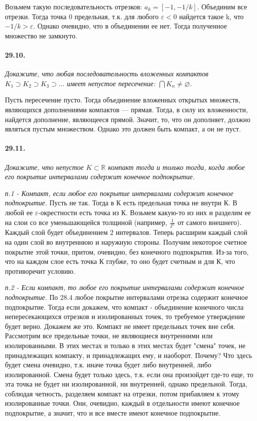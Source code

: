 \documentclass{book}
\begin{document}
Возьмем такую последовательность отрезков: $a_k = [-1, -1/k]$. Объединим все отрезки. Тогда точка 0 предельная, т.к. для любого $\varepsilon < 0$ найдется такое k, что $-1/k > \varepsilon$. Однако очевидно, что в объединении ее нет. Тогда полученное множество не замкнуто.

\paragraph{29.10.}
\textit{Докажите, что любая последовательность вложенных компактов $K_1 \supset K_2 \supset K_3 \supset ... $ имеет непустое пересечение: $\bigcap K_n \neq \varnothing $.}

Пусть пересечение пусто. Тогда объединение вложенных открытых множеств, являющихся дополнениями компактов --- прямая. Тогда, в силу их вложенности, найдется дополнение, являющееся прямой. Значит, то, что он дополняет, должно являться пустым множеством. Однако это должен быть компакт, а он не пуст. 

\paragraph{29.11.}
\textit{Докажите, что непустое $K \subset \mathbb{R}$ компакт
тогда и только тогда, когда любое его покрытие интервалами содержит конечное подпокрытие.}

\textit{п.1 - Компакт, если любое его покрытие интервалами содержит конечное подпокрытие.} Пусть не так. Тогда в К есть предельная точка не внутри К. В любой ее $\varepsilon$-окрестности есть точка из К. Возьмем какую-то из них и разделим ее на слои со все уменьшающейся толщиной (например, $\frac{1}{2^n}$ от самого внешнего). Каждый слой будет объединением 2 интервалов. Теперь расширим каждый слой на один слой во внутреннюю и наружную стороны. Получим некоторое счетное покрытие этой точки, притом, очевидно, без конечного подпокрытия. Из-за того, что на каждом слое есть точка К глубже, то оно будет счетным и для К, что противоречит условию.

\textit{п.2 - Если компакт, то любое его покрытие интервалами содержит конечное подпокрытие.} По 28.4 любое покрытие интервалами отрезка содержит конечное подпокрытие. Тогда если докажем, что компакт - объединение конечного числа непересекающихся отрезков и изолированных точек, то требуемое утверждение будет верно. Докажем же это. Компакт не имеет предельных точек вне себя. Рассмотрим все предельные точки, не являющиеся внутренними или изолированными. В этих местах и только в этих местах будет "смена" \text{} точек, не принадлежащих компакту, и принадлежащих ему, и наоборот. Почему? Что здесь будет смена очевидно, т.к. иначе точка будет либо внутренней, либо изолированной. Смена будет только здесь, т.к. если она произойдет где-то еще, то эта точка не будет ни изолированной, ни внутренней, однако предельной. Тогда, соблюдая четность, разделяем компакт на отрезки, потом прибавляем к этому изолированные точки. Они, очевидно, каждый в отдельности имеют конечное подпокрытие, а значит, что и все вместе имеют конечное подпокрытие.
\end{document}
